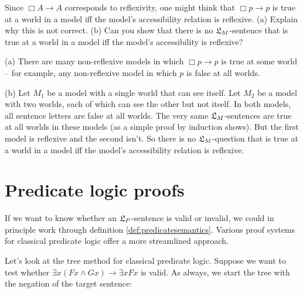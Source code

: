 \begin{exercise}
  Since $\Box A \to A$ corresponds to reflexivity, one might think that
  $\Box p \to p$ is true at a world in a model iff the model's accessibility
  relation is reflexive. (a) Explain why this is not correct. (b) Can you 
  show that there is no $\mathfrak{L}_{M}$-sentence that is true at a world in a model iff
  the model's accessibility is reflexive?
\end{exercise}
\begin{solution}
  (a) There are many non-reflexive models in which $\Box p \to p$ is true at some
  world -- for example, any non-reflexive model in which $p$ is false at all
  worlds.

  (b) Let $M_1$ be a model with a single world that can see itself. Let $M_{2}$
  be a model with two worlds, each of which can see the other but not itself. In
  both models, all sentence letters are false at all worlds. The very same
  $\mathfrak{L}_M$-sentences are true at all worlds in these models (as a simple proof by
  induction shows). But the first model is reflexive and the second isn't. So
  there is no $\mathfrak{L}_{M}$-question that is true at a world in a model iff the
  model's accessibility relation is reflexive.
\end{solution}




\section{Predicate logic proofs}

If we want to know whether an $\mathfrak{L}_{P}$-sentence is valid or invalid, we
could in principle work through definition \ref{def:predicatesemantics}. Various
proof systems for classical predicate logic offer a more streamlined approach.

Let's look at the tree method for classical predicate logic. Suppose we want to
test whether $\exists x(Fx \land Gx) \to \exists x Fx$ is valid. As always, we
start the tree with the negation of the target sentence:


